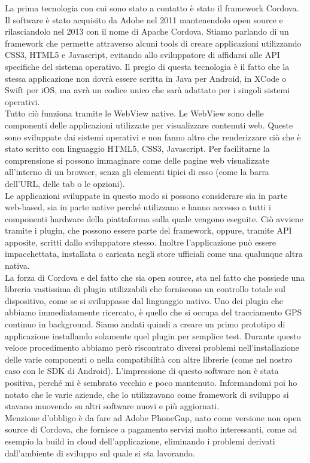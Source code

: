 La prima tecnologia con cui sono stato a contatto è stato il framework Cordova. Il software è stato acquisito da Adobe nel 2011 mantenendolo \gls{open source} e
rilasciandolo nel 2013 con il nome di Apache Cordova. Stiamo parlando di un framework che permette attraverso alcuni tools di creare applicazioni utilizzando CSS3, HTML5 e
Javascript, evitando allo sviluppatore di affidarsi alle API specifiche del sistema operativo. Il pregio di questa tecnologia è il fatto che la stessa
applicazione non dovrà essere scritta in Java per Android, in XCode o Swift per iOS, ma avrà un codice unico che sarà adattato per i singoli sistemi operativi. \\
Tutto ciò funziona tramite le WebView native. Le WebView sono delle componenti delle applicazioni utilizzate per visualizzare contenuti web. Queste sono
sviluppate dai sistemi operativi e non fanno altro che renderizzare ciò che è stato scritto con linguaggio HTML5, CSS3, Javascript. Per facilitarne la
comprensione si possono immaginare come delle pagine web visualizzate all'interno di un browser, senza gli elementi tipici di esso (come la barra dell'URL,
delle tab o le opzioni). \\
Le applicazioni sviluppate in questo modo si possono considerare sia in parte \gls{web-based}, sia in parte native perché utilizzano e hanno accesso a tutti i componenti
hardware della piattaforma sulla quale vengono eseguite. Ciò avviene tramite i plugin, che possono essere parte del framework, oppure, tramite API apposite,
scritti dallo sviluppatore stesso. Inoltre l'applicazione può essere impacchettata, installata o caricata negli store ufficiali come una qualunque altra nativa.
\\
La forza di Cordova e del fatto che sia open source, sta nel fatto che possiede una libreria vastissima di plugin utilizzabili che forniscono un controllo
totale sul dispositivo, come se si sviluppasse dal linguaggio nativo. Uno dei plugin che abbiamo immediatamente ricercato, è quello che si occupa del
tracciamento GPS continuo in \gls{background}. Siamo andati quindi a creare un primo prototipo di applicazione installando solamente quel plugin per semplice
test. Durante questo veloce procedimento abbiamo però riscontrato diversi problemi nell'installazione delle varie componenti o nella compatibilità con altre
librerie (come nel nostro caso con le \gls{SDK} di Android). L'impressione di questo software non è stata positiva, perché mi è sembrato vecchio
e poco mantenuto. Informandomi poi ho notato che le varie aziende, che lo utilizzavano come framework di sviluppo si stavano muovendo su altri software nuovi e
più aggiornati.\\
Menzione d'obbligo è da fare ad Adobe PhoneGap, nato come versione non \gls{open source} di Cordova, che fornisce a pagamento servizi molto interessanti, come ad
esempio la build in cloud dell'applicazione, eliminando i problemi derivati dall'ambiente di sviluppo sul quale si sta lavorando.

